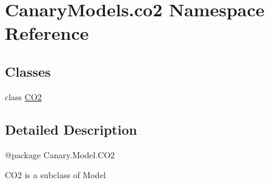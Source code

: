 \hypertarget{namespace_canary_models_1_1co2}{\section{Canary\-Models.\-co2 Namespace Reference}
\label{namespace_canary_models_1_1co2}
}
\subsection*{Classes}
\begin{DoxyCompactItemize}
\item 
class \hyperlink{class_canary_models_1_1co2_1_1_c_o2}{C\-O2}
\end{DoxyCompactItemize}


\subsection{Detailed Description}
\begin{DoxyVerb}@package Canary.Model.CO2

CO2 is a subclass of Model
\end{DoxyVerb}
 